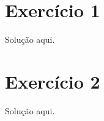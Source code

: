 \documentclass[a4paper,12pt]{article}
\begin{document}
\section*{Exercício 1}
Solução aqui.

\newpage
\section*{Exercício 2}
Solução aqui.
\end{document}
